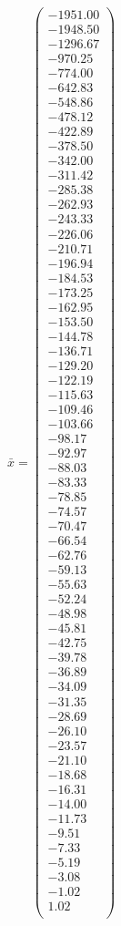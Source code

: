 \documentclass[a4paper,12pt]{article}
\begin{document}
$\bar { x } = \begin{pmatrix}
-1951.00 \\
-1948.50 \\
-1296.67 \\
-970.25 \\
-774.00 \\
-642.83 \\
-548.86 \\
-478.12 \\
-422.89 \\
-378.50 \\
-342.00 \\
-311.42 \\
-285.38 \\
-262.93 \\
-243.33 \\
-226.06 \\
-210.71 \\
-196.94 \\
-184.53 \\
-173.25 \\
-162.95 \\
-153.50 \\
-144.78 \\
-136.71 \\
-129.20 \\
-122.19 \\
-115.63 \\
-109.46 \\
-103.66 \\
-98.17 \\
-92.97 \\
-88.03 \\
-83.33 \\
-78.85 \\
-74.57 \\
-70.47 \\
-66.54 \\
-62.76 \\
-59.13 \\
-55.63 \\
-52.24 \\
-48.98 \\
-45.81 \\
-42.75 \\
-39.78 \\
-36.89 \\
-34.09 \\
-31.35 \\
-28.69 \\
-26.10 \\
-23.57 \\
-21.10 \\
-18.68 \\
-16.31 \\
-14.00 \\
-11.73 \\
-9.51 \\
-7.33 \\
-5.19 \\
-3.08 \\
-1.02 \\
1.02 \\
\end{pmatrix}
$
\end{document}
